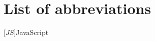 \clearpage
\chapter*{\textbf{List of abbreviations}}\label{abblist}
\begin{acronym}[YTM]
  \setlength{\itemsep}{-\parsep}

  [$JS$]{\hspace{1.9cm}JavaScript}


\end{acronym}


